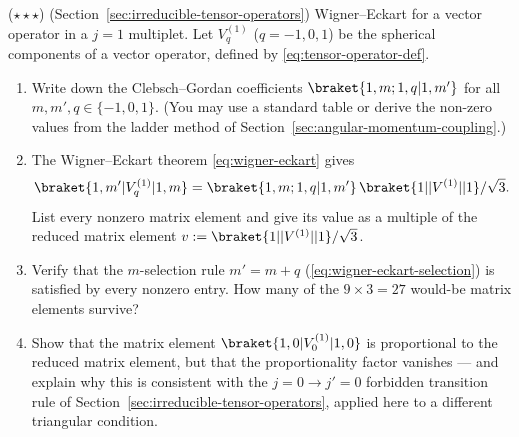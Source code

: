 \begin{problemset}
\item ($\star\star\star$) (Section~\ref{sec:irreducible-tensor-operators}) Wigner--Eckart for a vector operator in a $j=1$ multiplet. Let $V^{(1)}_q$ ($q = -1,0,1$) be the spherical components of a vector operator, defined by \eqref{eq:tensor-operator-def}.
\begin{enumerate}
\item[(a)] Write down the Clebsch--Gordan coefficients $\braket{1,m;1,q|1,m'}$ for all $m,m',q \in \{-1,0,1\}$. (You may use a standard table or derive the non-zero values from the ladder method of Section~\ref{sec:angular-momentum-coupling}.)
\item[(b)] The Wigner--Eckart theorem \eqref{eq:wigner-eckart} gives
\begin{equation*}
\braket{1,m'|V^{(1)}_q|1,m} = \braket{1,m;1,q|1,m'}\,\braket{1||V^{(1)}||1}/\sqrt{3}.
\end{equation*}
List every nonzero matrix element and give its value as a multiple of the reduced matrix element $v := \braket{1||V^{(1)}||1}/\sqrt{3}$.
\item[(c)] Verify that the $m$-selection rule $m' = m+q$ (\eqref{eq:wigner-eckart-selection}) is satisfied by every nonzero entry. How many of the $9\times3 = 27$ would-be matrix elements survive?
\item[(d)] Show that the matrix element $\braket{1,0|V^{(1)}_0|1,0}$ is proportional to the reduced matrix element, but that the proportionality factor vanishes --- and explain why this is consistent with the $j=0\to j'=0$ forbidden transition rule of Section~\ref{sec:irreducible-tensor-operators}, applied here to a different triangular condition.
\end{enumerate}


\end{problemset}
